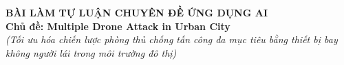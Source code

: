 \documentclass[../main.tex]{subfiles}
\begin{document}

\begin{center}
    \textbf{\LARGE BÀI LÀM TỰ LUẬN CHUYÊN ĐỀ ỨNG DỤNG AI} \\
    \vspace{0.2cm}
    \textbf{\large Chủ đề: Multiple Drone Attack in Urban City} \\
    \textit{(Tối ưu hóa chiến lược phòng thủ chống tấn công đa mục tiêu bằng thiết bị bay không người lái trong môi trường đô thị)}
\end{center}

\vspace{0.5cm}
\end{document}
